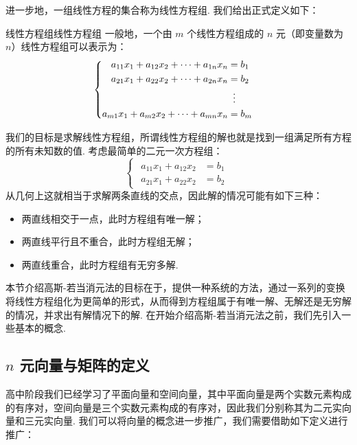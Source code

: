 进一步地，一组线性方程的集合称为线性方程组. 我们给出正式定义如下：

\begin{definition}{线性方程组}{线性方程组}
    一般地，一个由 $m$ 个线性方程组成的 $n$ 元（即变量数为 $n$）线性方程组可以表示为：
    \[ \begin{cases}
        \begin{aligned}
            a_{11}x_1+a_{12}x_2+\cdots+a_{1n}x_n & = b_1 \\
            a_{21}x_1+a_{22}x_2+\cdots+a_{2n}x_n & = b_2 \\
                                                & \vdotswithin{=} \\
            a_{m1}x_1+a_{m2}x_2+\cdots+a_{mn}x_n & = b_m
        \end{aligned}
    \end{cases} \]
\end{definition}

我们的目标是求解线性方程组，所谓线性方程组的解也就是找到一组满足所有方程的所有未知数的值. 考虑最简单的二元一次方程组：
\[ \begin{cases}
    \begin{aligned}
        a_{11}x_1+a_{12}x_2 & = b_1 \\
        a_{21}x_1+a_{22}x_2 & = b_2
    \end{aligned}
\end{cases} \]
从几何上这就相当于求解两条直线的交点，因此解的情况可能有如下三种：
\begin{itemize}
    \item 两直线相交于一点，此时方程组有唯一解；
    \item 两直线平行且不重合，此时方程组无解；
    \item 两直线重合，此时方程组有无穷多解.
\end{itemize}

本节介绍高斯-若当消元法的目标在于，提供一种系统的方法，通过一系列的变换将线性方程组化为更简单的形式，从而得到方程组属于有唯一解、无解还是无穷解的情况，并求出有解情况下的解. 在开始介绍高斯-若当消元法之前，我们先引入一些基本的概念.

\subsection{$n$ 元向量与矩阵的定义}

高中阶段我们已经学习了平面向量和空间向量，其中平面向量是两个实数元素构成的有序对，空间向量是三个实数元素构成的有序对，因此我们分别称其为二元实向量和三元实向量. 我们可以将向量的概念进一步推广，我们需要借助如下定义进行推广：

